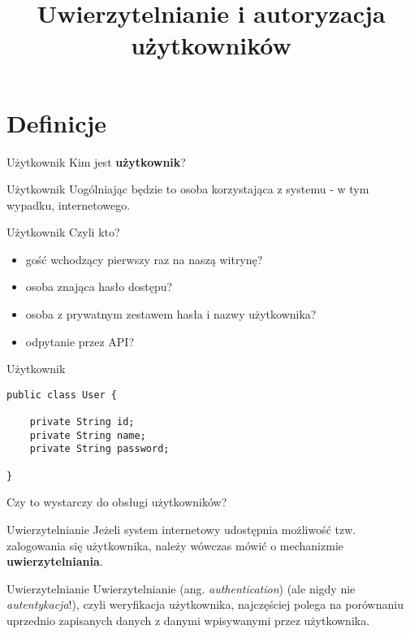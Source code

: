 

\title{Uwierzytelnianie i autoryzacja użytkowników}



\section{Definicje}

\begin{frame}{Użytkownik}
	Kim jest \textbf{użytkownik}?
\end{frame}

\begin{frame}{Użytkownik}
	Uogólniając będzie to osoba korzystająca z systemu - w tym wypadku, internetowego.
\end{frame}

\begin{frame}{Użytkownik}
	Czyli kto?
	
	\begin{itemize}
		\item gość wchodzący pierwszy raz na naszą witrynę?
		\item osoba znająca hasło dostępu?
		\item osoba z prywatnym zestawem hasła i nazwy użytkownika?
		\item odpytanie przez API?
	\end{itemize}
\end{frame}

\begin{frame}[fragile]{Użytkownik}
	\begin{lstlisting}
public class User {

    private String id;
    private String name;
    private String password;

}
	\end{lstlisting}
	
	Czy to wystarczy do obsługi użytkowników?
\end{frame}

\begin{frame}{Uwierzytelnianie}
	Jeżeli system internetowy udostępnia możliwość tzw. zalogowania się użytkownika, należy wówczas mówić o mechanizmie \textbf{uwierzytelniania}.
\end{frame}

\begin{frame}{Uwierzytelnianie}
	Uwierzytelnianie (ang. \emph{authentication}) (ale nigdy nie \emph{autentykacja}!), czyli weryfikacja użytkownika, najczęściej polega na porównaniu uprzednio zapisanych danych z danymi wpisywanymi przez użytkownika.
\end{frame}


